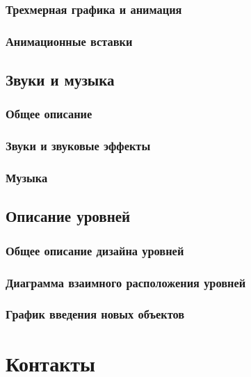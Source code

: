 \documentclass{article}
\begin{document}
\subsubsection{Трехмерная графика и анимация}
\subsubsection{Анимационные вставки}
\subsection{Звуки и музыка}
\subsubsection{Общее описание}
\subsubsection{Звуки и звуковые эффекты}
\subsubsection{Музыка}
\subsection{Описание уровней}
\subsubsection{Общее описание дизайна уровней}
\subsubsection{Диаграмма взаимного расположения уровней}
\subsubsection{ График введения новых объектов}
\section{Контакты}


\end{document}
